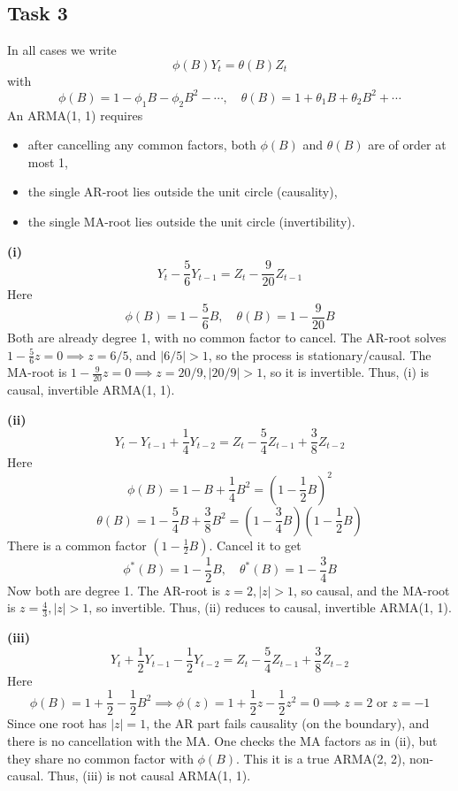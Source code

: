 \documentclass[11pt,a4paper]{article}
\begin{document}
    \subsection*{Task 3}
    In all cases we write
    \[ \phi(B) Y_t = \theta(B) Z_{t} \]
    with
    \[ \phi(B) = 1 - \phi_1 B - \phi_2 B^2 - \cdots, \quad \theta(B) = 1 + \theta_1 B + \theta_2 B^2 + \cdots \]
    An ARMA(1, 1) requires
    \begin{itemize}
        \item after cancelling any common factors, both $\phi(B)$ and $\theta(B)$ are of order at most 1,
        \item the single AR-root lies outside the unit circle (causality),
        \item the single MA-root lies outside the unit circle (invertibility).
    \end{itemize}

    \noindent \textbf{(i)}
    \[ Y_t - \frac56 Y_{t-1} = Z_t - \frac9{20} Z_{t-1} \]
    Here
    \[ \phi(B) = 1 - \frac56 B, \quad \theta(B) = 1 - \frac9{20} B \]
    Both are already degree 1, with no common factor to cancel. The AR-root solves $1 - \frac56 z = 0 \implies z = 6/5$, and $|6/5| > 1$, so the process is stationary/causal. The MA-root is $1-\frac{9}{20} z = 0 \implies z = 20/9, |20/9| > 1$, so it is invertible. Thus, (i) is causal, invertible ARMA(1, 1).

    \noindent \textbf{(ii)} \[ Y_t - Y_{t-1} + \frac14 Y_{t-2} = Z_t - \frac54 Z_{t-1} + \frac38 Z_{t-2} \] Here \[ \phi(B) = 1 - B + \frac14 B^2 = \left( 1 - \frac12 B\right)^2 \]
    \[ \theta(B) = 1 - \frac54 B + \frac38 B^2 = \left(1-\frac34 B\right)\left( 1-\frac12 B\right) \]
    There is a common factor $\left(1-\frac12 B\right)$. Cancel it to get
    \[ \phi^*(B) = 1 - \frac12 B, \quad \theta^*(B) = 1 - \frac34 B \]
    Now both are degree 1. The AR-root is $z = 2, |z| > 1$, so causal, and the MA-root is $z = \frac43, |z| > 1$, so invertible. Thus, (ii) reduces to causal, invertible ARMA(1, 1).

    \noindent \textbf{(iii)} \[ Y_t + \frac12 Y_{t-1} - \frac12 Y_{t-2} = Z_t - \frac54 Z_{t-1} + \frac38 Z_{t-2} \]
    Here
    \[ \phi(B) = 1 + \frac12 - \frac12 B^2 \implies \phi(z) = 1 + \frac12 z - \frac12 z^2 = 0 \implies z = 2 \text{ or } z = -1 \]
    Since one root has $|z| = 1$, the AR part fails causality (on the boundary), and there is no cancellation with the MA. One checks the MA factors as in (ii), but they share no common factor with $\phi(B)$. This it is a true ARMA(2, 2), non-causal. Thus, (iii) is not causal ARMA(1, 1).
\end{document}
